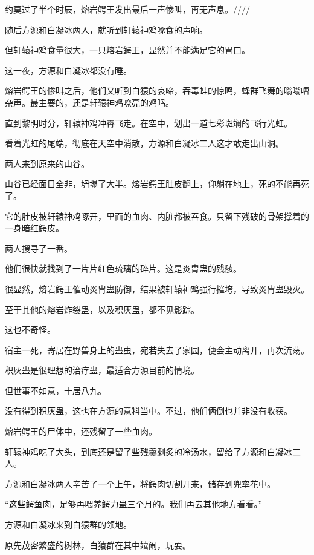 
\begin{this_body}

约莫过了半个时辰，熔岩鳄王发出最后一声惨叫，再无声息。////

随后方源和白凝冰两人，就听到轩辕神鸡啄食的声响。

但轩辕神鸡食量很大，一只熔岩鳄王，显然并不能满足它的胃口。

这一夜，方源和白凝冰都没有睡。

熔岩鳄王的惨叫之后，他们又听到白猿的哀啼，吞毒蛙的惊鸣，蜂群飞舞的嗡嗡嘈杂声。最主要的，还是轩辕神鸡嘹亮的鸡鸣。

直到黎明时分，轩辕神鸡冲霄飞走。在空中，划出一道七彩斑斓的飞行光虹。

看着光虹的尾端，彻底在天空中消散，方源和白凝冰二人这才敢走出山洞。

两人来到原来的山谷。

山谷已经面目全非，坍塌了大半。熔岩鳄王肚皮翻上，仰躺在地上，死的不能再死了。

它的肚皮被轩辕神鸡啄开，里面的血肉、内脏都被吞食。只留下残破的骨架撑着的一身暗红鳄皮。

两人搜寻了一番。

他们很快就找到了一片片红色琉璃的碎片。这是炎胄蛊的残骸。

很显然，熔岩鳄王催动炎胄蛊防御，结果被轩辕神鸡强行摧垮，导致炎胄蛊毁灭。

至于其他的熔岩炸裂蛊，以及积灰蛊，都不见影踪。

这也不奇怪。

宿主一死，寄居在野兽身上的蛊虫，宛若失去了家园，便会主动离开，再次流荡。

积灰蛊是很理想的治疗蛊，最适合方源目前的情境。

但世事不如意，十居八九。

没有得到积灰蛊，这也在方源的意料当中。不过，他们俩倒也并非没有收获。

熔岩鳄王的尸体中，还残留了一些血肉。

轩辕神鸡吃了大头，到底还是留了些残羹剩炙的冷汤水，留给了方源和白凝冰二人。

方源和白凝冰两人辛苦了一个上午，将鳄肉切割开来，储存到兜率花中。

“这些鳄鱼肉，足够再喂养鳄力蛊三个月的。我们再去其他地方看看。”

方源和白凝冰来到白猿群的领地。

原先茂密繁盛的树林，白猿群在其中嬉闹，玩耍。


\end{this_body}
